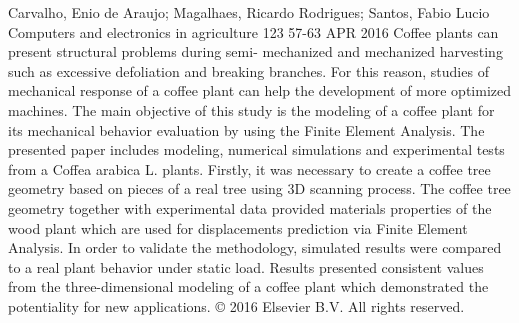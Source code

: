 {Carvalho, Enio de Araujo; Magalhaes, Ricardo Rodrigues; Santos, Fabio
  Lucio}%
{Computers and electronics in agriculture}%
{123}%
{}%
{57-63}%
{APR 2016}%
{Coffee plants can present structural problems during semi- mechanized and
  mechanized harvesting such as excessive defoliation and breaking branches. For
  this reason, studies of mechanical response of a coffee plant can help the
  development of more optimized machines.  The main objective of this study is
  the modeling of a coffee plant for its mechanical behavior evaluation by using
  the Finite Element Analysis. The presented paper includes modeling, numerical
  simulations and experimental tests from a Coffea arabica L. plants. Firstly,
  it was necessary to create a coffee tree geometry based on pieces of a real
  tree using 3D scanning process. The coffee tree geometry together with
  experimental data provided materials properties of the wood plant which are
  used for displacements prediction via Finite Element Analysis. In order to
  validate the methodology, simulated results were compared to a real plant
  behavior under static load. Results presented consistent values from the
  three-dimensional modeling of a coffee plant which demonstrated the
  potentiality for new applications. \copyright{} 2016 Elsevier B.V. All rights
  reserved.}%







